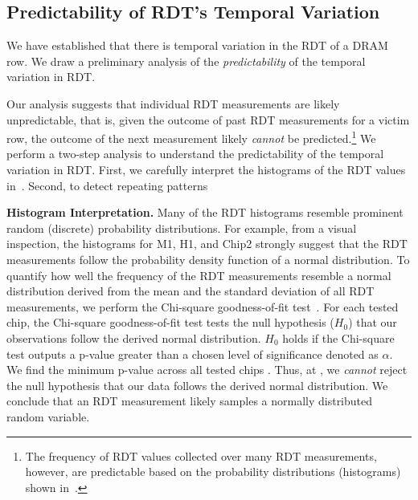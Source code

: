\subsection{Predictability of RDT's Temporal Variation}
\label{subsec:characterization_predictability}

We have established that there is temporal variation in the RDT of a DRAM row.
We draw a preliminary analysis of the \emph{predictability} of the temporal
variation in RDT. 

\vspace{2pt}

Our analysis suggests that individual RDT measurements are likely unpredictable,
that is, given the outcome of past RDT measurements for a victim row, the
outcome of the next measurement likely \emph{cannot} be predicted.\footnote{The
frequency of RDT values collected over many RDT measurements, however, are
predictable based on the probability distributions (histograms) shown
in~.} We perform a two-step analysis to
understand the predictability of the temporal variation in RDT. First, we
carefully interpret the histograms of the RDT values
in~. Second,  to detect repeating
patterns


\noindent
\textbf{Histogram Interpretation.} Many of the RDT histograms resemble prominent
random (discrete) probability distributions. For example, from a visual
inspection, the histograms for M1, H1, and Chip2 strongly suggest that the RDT
measurements follow the probability density function of a normal distribution.
To quantify how well the frequency of the RDT measurements resemble a
normal distribution derived from the mean and the standard deviation of all RDT
measurements, we perform the Chi-square goodness-of-fit test~\cite{pearson1900}.
For each tested chip, the Chi-square goodness-of-fit test tests the null
hypothesis ($H_{0}$) that our observations follow the derived normal
distribution. $H_{0}$ holds if the Chi-square test outputs a p-value greater
than a chosen level of significance denoted as $\alpha$.
We find the minimum p-value across all tested chips  .
Thus, at , we \emph{cannot} reject the null hypothesis
that our data follows the derived normal distribution. We conclude that an RDT
measurement likely samples a normally distributed random variable.


